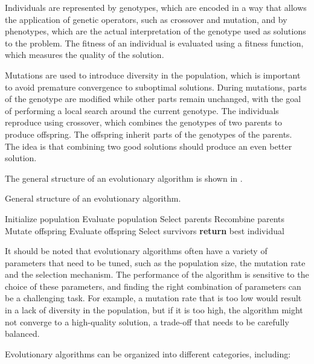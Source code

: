 Individuals are represented by genotypes, which are encoded in a way that allows the application of genetic operators, such as crossover and mutation, and
by phenotypes, which are the actual interpretation of the genotype used as solutions to the problem. The fitness of an individual is evaluated using a
fitness function, which measures the quality of the solution.

Mutations are used to introduce diversity in the population, which is important to avoid premature convergence to suboptimal solutions. During mutations,
parts of the genotype are modified while other parts remain unchanged, with the goal of performing a local search around the current genotype.
The individuals reproduce using crossover, which combines the genotypes of two parents to produce offspring. The offspring inherit parts of the genotypes
of the parents. The idea is that combining two good solutions should produce an even better solution.

The general structure of an evolutionary algorithm is shown in .

\begin{algorithm}[H]
    \caption{General structure of an evolutionary algorithm.}
    \label{alg:ea}
    \begin{algorithmic}
        \State Initialize population
        \State Evaluate population
            \State Select parents
            \State Recombine parents
            \State Mutate offspring
            \State Evaluate offspring
            \State Select survivors
        \EndWhile
        \State \textbf{return} best individual
    \end{algorithmic}
\end{algorithm}

It should be noted that evolutionary algorithms often have a variety of parameters that need to be tuned, such as the population size, the mutation rate
and the selection mechanism. The performance of the algorithm is sensitive to the choice of these parameters, and finding the
right combination of parameters can be a challenging task. For example, a mutation rate that is too low would result in a lack of diversity in the population, but if
it is too high, the algorithm might not converge to a high-quality solution, a trade-off that needs to be carefully balanced.

Evolutionary algorithms can be organized into different categories, including:

